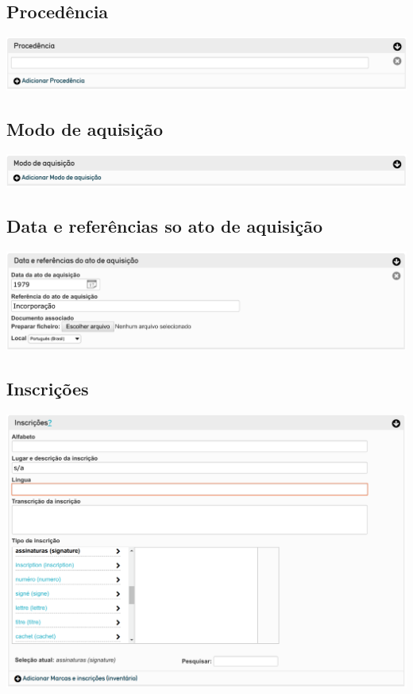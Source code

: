 \subsection{Procedência}
\begin{flushleft}
	\includegraphics[width=\linewidth]{elemento-08}
\end{flushleft}

\subsection{Modo de aquisição}
\begin{flushleft}
	\includegraphics[width=\linewidth]{elemento-09}
\end{flushleft}

\subsection{Data e referências so ato de aquisição}
\begin{flushleft}
	\includegraphics[width=\linewidth]{elemento-10}
\end{flushleft}

\subsection{Inscrições}
\begin{flushleft}
	\includegraphics[width=\linewidth]{elemento-11}
\end{flushleft}

